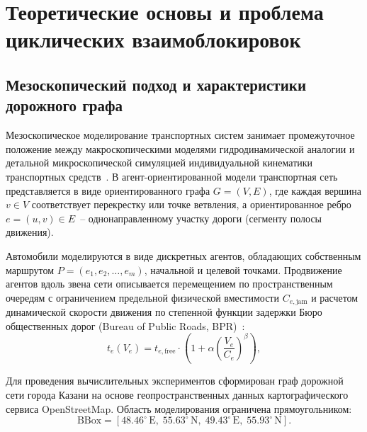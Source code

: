 \chapter{Теоретические основы и проблема циклических взаимоблокировок}
\label{chap:theory}

\section{Мезоскопический подход и характеристики дорожного графа}
\label{sec:mesoscopic_approach}

Мезоскопическое моделирование транспортных систем занимает промежуточное положение между макроскопическими моделями гидродинамической аналогии и детальной микроскопической симуляцией индивидуальной кинематики транспортных средств~\cite{daganzo1994ctm, behrisch2011sumo_meso}. В агент-ориентированной модели транспортная сеть представляется в виде ориентированного графа $G = (V, E)$, где каждая вершина $v \in V$ соответствует перекрестку или точке ветвления, а ориентированное ребро $e = (u, v) \in E$~-- однонаправленному участку дороги (сегменту полосы движения).

Автомобили моделируются в виде дискретных агентов, обладающих собственным маршрутом $P = (e_1, e_2, \dots, e_m)$, начальной и целевой точками. Продвижение агентов вдоль звена сети описывается перемещением по пространственным очередям с ограничением предельной физической вместимости $C_{e,\text{jam}}$ и расчетом динамической скорости движения по степенной функции задержки Бюро общественных дорог (Bureau of Public Roads, BPR)~\cite{bpr1964}:
\begin{equation}
t_e(V_e) = t_{e,\text{free}} \cdot \left( 1 + \alpha \left( \frac{V_e}{C_e} \right)^\beta \right),
\label{eq:bpr_delay}
\end{equation}

Для проведения вычислительных экспериментов сформирован граф дорожной сети города Казани на основе геопространственных данных картографического сервиса OpenStreetMap. Область моделирования ограничена прямоугольником:
\begin{equation}
\text{BBox} = [48.46^\circ\,\text{E},\; 55.63^\circ\,\text{N},\; 49.43^\circ\,\text{E},\; 55.93^\circ\,\text{N}].
\label{eq:kazan_bbox}
\end{equation}

